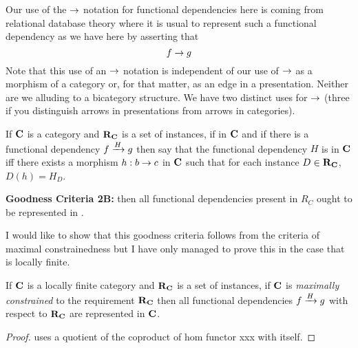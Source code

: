 \documentclass[xcolor=pst,dvips]{beamer}
\begin{document}
\begin{frame}
Our use of the $\morph$ notation for functional dependencies here is coming from relational database theory where it is usual to represent such a functional dependency as we have here by asserting that 
$$
f \morph g
$$
Note that this use of an $\morph$ notation is independent of our use of $\morph$ as a morphism of a category 
or, for that matter, as an edge in a presentation. Neither are we alluding to a bicategory structure. We have two distinct uses for $\morph$ (three if you distinguish arrows in presentations from arrows in categories). 
\end{frame}


\begin{frame}
\begin{definition}
If $\catc$ is a category and $\reqtc$ is a set of instances, if
\fgsourcediag
in $\catc$ 
and if there is a functional dependency $\fundep{H}{f}{g}$ then say that 
the functional dependency $H$ is  in $\catc$ 
iff there exists a morphism $h:b \morph c$ in $\catc$ such that for each instance $D \in \reqtc$, $D(h)=H_D$.
\end{definition}
\end{frame}

\begin{frame}
\textbf {Goodness Criteria 2B:} \IfSforCwithRCwords then all functional dependencies present in $R_C$
ought to be represented in \catc.

I would like to show that this goodness criteria follows from the criteria of maximal constrainedness
but I have only managed to prove this in the case that \catcw is locally finite.
\end{frame}

\begin{frame}
\begin{lemma}
If $\catc$ is a locally finite category and $\reqtc$ is a set of instances, if $\catc$ is 
\textit{maximally constrained} to the requirement $\reqtc$ then
all functional dependencies $\fundep{H}{f}{g}$  with respect to $\reqtc$ are represented in $\catc$.
\end{lemma}
\begin{proof}
uses a quotient of the coproduct of hom functor xxx with itself.
\end{proof}
\end{frame}
\end{document}
